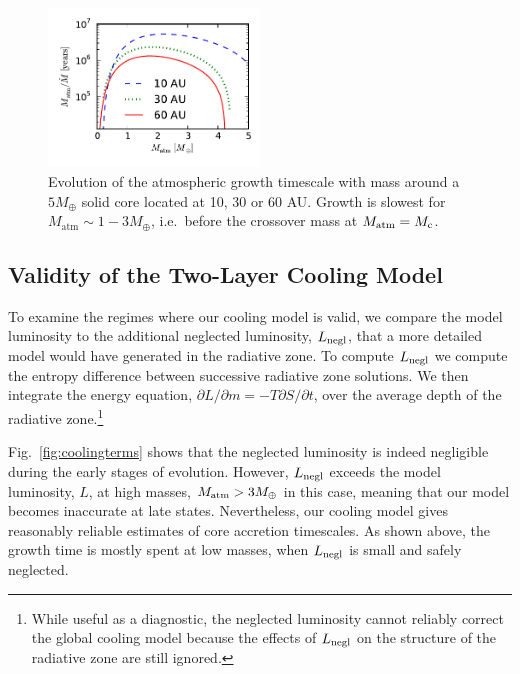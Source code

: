 \documentclass[apj, numberedappendix]{emulateapj}
\newcommand{\p}{\partial}
\newcommand{\Fig}[1]{Fig.~\ref{#1}}
\newcommand{\co}{_{\rm c}}
\begin{document}

\begin{figure}[tb]
\centering
\includegraphics[width=0.5\textwidth]{../../figs/ModelAtmospheres/RadSelfGravPoly/PaperFigs/Mt_profile_temp.pdf}
\caption{Evolution of the atmospheric growth timescale with mass around a $5 M_{\oplus}$ solid core  located at 10, 30 or 60 AU.  Growth is slowest for $M_{\mathrm{atm}} \sim 1 - 3 M_{\oplus}$, i.e.\ before the crossover mass at $M_{\rm atm} = M\co$.}
\label{fig:growthtime}
\end{figure}

\subsection{Validity of the Two-Layer Cooling Model}
\label{sec:endoftime}

To examine the regimes where our cooling model is valid, we compare the model luminosity to the additional neglected luminosity, $L_{\rm negl}$, that a more detailed model would have generated in the radiative zone.  To compute $L_{\rm negl}$ we compute the entropy difference between successive radiative zone solutions.  We then integrate the energy equation, $\p L / \p m = - T \p S/ \p t$, over the average depth of the radiative zone.\footnote{While useful as a diagnostic, the neglected luminosity cannot reliably correct the global cooling model because the effects of $L_{\rm negl}$ on the structure of the radiative zone are still ignored.}

 \Fig{fig:coolingterms} shows that the neglected luminosity is indeed negligible during the early stages of evolution.  However, $L_{\rm negl}$ exceeds the model luminosity, $L$, at high masses, $M_{\rm atm} > 3 M_\oplus$ in this case, meaning that our model becomes inaccurate at late states.  Nevertheless, our cooling model gives  reasonably reliable estimates of core accretion timescales.   As shown above, the growth time is mostly spent at low masses, when $L_{\rm negl}$ is small and safely neglected.
 
\end{document}
